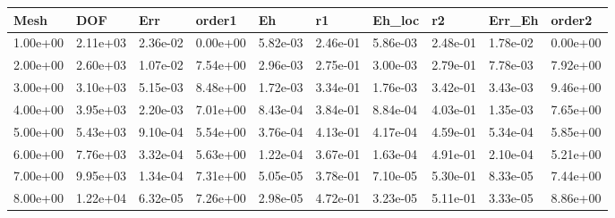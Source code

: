 \begin{tabular}{llllllllll}
Mesh & DOF & Err & order1 & Eh & r1 & Eh_loc & r2 & Err_Eh & order2 \\ 
\hline 
1.00e+00 & 2.11e+03 & 2.36e-02 & 0.00e+00 & 5.82e-03 & 2.46e-01 & 5.86e-03 & 2.48e-01 & 1.78e-02 & 0.00e+00 \\ 
2.00e+00 & 2.60e+03 & 1.07e-02 & 7.54e+00 & 2.96e-03 & 2.75e-01 & 3.00e-03 & 2.79e-01 & 7.78e-03 & 7.92e+00 \\ 
3.00e+00 & 3.10e+03 & 5.15e-03 & 8.48e+00 & 1.72e-03 & 3.34e-01 & 1.76e-03 & 3.42e-01 & 3.43e-03 & 9.46e+00 \\ 
4.00e+00 & 3.95e+03 & 2.20e-03 & 7.01e+00 & 8.43e-04 & 3.84e-01 & 8.84e-04 & 4.03e-01 & 1.35e-03 & 7.65e+00 \\ 
5.00e+00 & 5.43e+03 & 9.10e-04 & 5.54e+00 & 3.76e-04 & 4.13e-01 & 4.17e-04 & 4.59e-01 & 5.34e-04 & 5.85e+00 \\ 
6.00e+00 & 7.76e+03 & 3.32e-04 & 5.63e+00 & 1.22e-04 & 3.67e-01 & 1.63e-04 & 4.91e-01 & 2.10e-04 & 5.21e+00 \\ 
7.00e+00 & 9.95e+03 & 1.34e-04 & 7.31e+00 & 5.05e-05 & 3.78e-01 & 7.10e-05 & 5.30e-01 & 8.33e-05 & 7.44e+00 \\ 
8.00e+00 & 1.22e+04 & 6.32e-05 & 7.26e+00 & 2.98e-05 & 4.72e-01 & 3.23e-05 & 5.11e-01 & 3.33e-05 & 8.86e+00 \\ 
\hline 
\end{tabular}